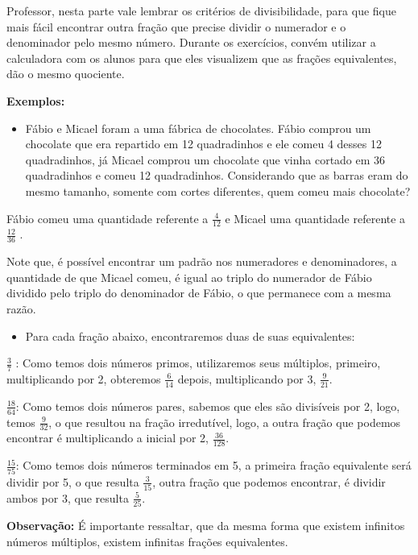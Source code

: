 {{{Professor, nesta parte vale lembrar os critérios de divisibilidade, para
que fique mais fácil encontrar outra fração que precise dividir o
numerador e o denominador pelo mesmo número. Durante os exercícios,
convém utilizar a calculadora com os alunos para que eles visualizem que
as frações equivalentes, dão o mesmo quociente.

\textbf{Exemplos:}

\begin{itemize}
\tightlist
\item
  Fábio e Micael foram a uma fábrica de chocolates. Fábio comprou um
  chocolate que era repartido em 12 quadradinhos e ele comeu 4 desses 12
  quadradinhos, já Micael comprou um chocolate que vinha cortado em 36
  quadradinhos e comeu 12 quadradinhos. Considerando que as barras eram
  do mesmo tamanho, somente com cortes diferentes, quem comeu mais
  chocolate?
\end{itemize}

Fábio comeu uma quantidade referente a \(\frac{4}{12}\) e Micael uma
quantidade referente a \(\frac{12}{36}\) .

Note que, é possível encontrar um padrão nos numeradores e
denominadores, a quantidade de que Micael comeu, é igual ao triplo do
numerador de Fábio dividido pelo triplo do denominador de Fábio, o que
permanece com a mesma razão.

\begin{itemize}
\tightlist
\item
  Para cada fração abaixo, encontraremos duas de suas equivalentes:
\end{itemize}

\(\frac{3}{7}\) : Como temos dois números primos, utilizaremos seus
múltiplos, primeiro, multiplicando por 2, obteremos \(\frac{6}{14}\)
depois, multiplicando por 3, \(\frac{9}{21}\).

\(\frac{18}{64}\): Como temos dois números pares, sabemos que eles são
divisíveis por 2, logo, temos \(\frac{9}{32}\), o que resultou na fração
irredutível, logo, a outra fração que podemos encontrar é multiplicando
a inicial por 2, \(\frac{36}{128}\).

\(\frac{15}{75}\): Como temos dois números terminados em 5, a primeira
fração equivalente será dividir por 5, o que resulta \(\frac{3}{15}\),
outra fração que podemos encontrar, é dividir ambos por 3, que resulta
\(\frac{5}{25}\).

\textbf{Observação:} É importante ressaltar, que da mesma forma que
existem infinitos números múltiplos, existem infinitas frações
equivalentes.

}}}

